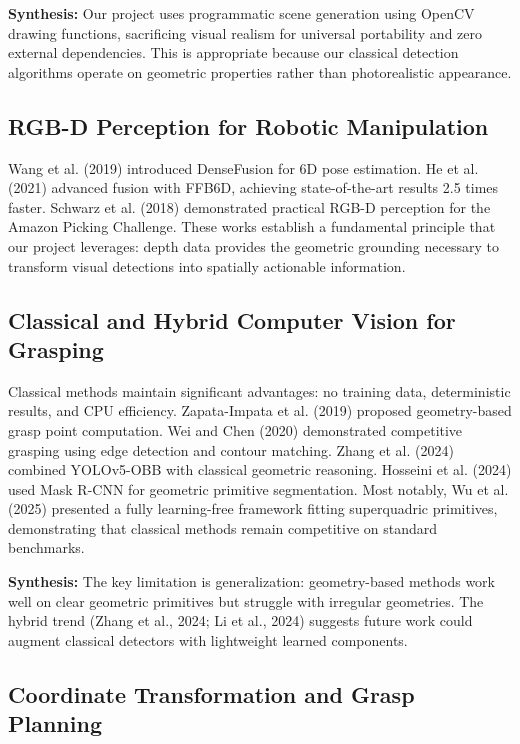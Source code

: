 \documentclass[11pt,a4paper]{article}
\begin{document}
\textbf{Synthesis:} Our project uses programmatic scene generation using OpenCV drawing functions, sacrificing visual realism for universal portability and zero external dependencies. This is appropriate because our classical detection algorithms operate on geometric properties rather than photorealistic appearance.

\subsection{RGB-D Perception for Robotic Manipulation}

Wang et al. (2019) introduced DenseFusion for 6D pose estimation. He et al. (2021) advanced fusion with FFB6D, achieving state-of-the-art results 2.5 times faster. Schwarz et al. (2018) demonstrated practical RGB-D perception for the Amazon Picking Challenge. These works establish a fundamental principle that our project leverages: depth data provides the geometric grounding necessary to transform visual detections into spatially actionable information.

\subsection{Classical and Hybrid Computer Vision for Grasping}

Classical methods maintain significant advantages: no training data, deterministic results, and CPU efficiency. Zapata-Impata et al. (2019) proposed geometry-based grasp point computation. Wei and Chen (2020) demonstrated competitive grasping using edge detection and contour matching. Zhang et al. (2024) combined YOLOv5-OBB with classical geometric reasoning. Hosseini et al. (2024) used Mask R-CNN for geometric primitive segmentation. Most notably, Wu et al. (2025) presented a fully learning-free framework fitting superquadric primitives, demonstrating that classical methods remain competitive on standard benchmarks.

\textbf{Synthesis:} The key limitation is generalization: geometry-based methods work well on clear geometric primitives but struggle with irregular geometries. The hybrid trend (Zhang et al., 2024; Li et al., 2024) suggests future work could augment classical detectors with lightweight learned components.

\subsection{Coordinate Transformation and Grasp Planning}
\end{document}
